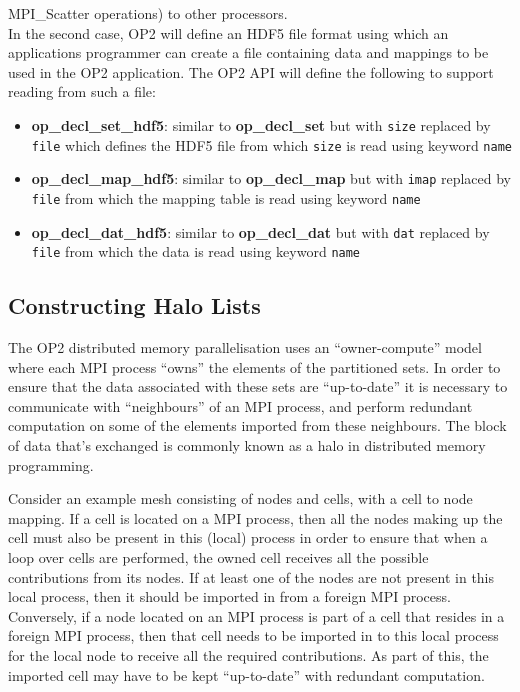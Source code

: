 \documentclass[12pt]{article}
\begin{document}
MPI\_Scatter operations) to other processors.\\
\indent In the second case, OP2 will define an HDF5 file format using which an applications programmer can create a
file containing data and mappings to be used in the OP2 application. The OP2 API will define the following to support
reading from such a file:
\begin{itemize}
\item {\bf op\_decl\_set\_hdf5}: similar to {\bf op\_decl\_set} but with {\tt size} 
replaced by {\tt file} which defines the HDF5 file from which {\tt size} 
is read using keyword {\tt name}

\item {\bf op\_decl\_map\_hdf5}: similar to {\bf op\_decl\_map} but with {\tt imap} 
replaced by {\tt file} from which the mapping table is read using keyword {\tt name}

\item {\bf op\_decl\_dat\_hdf5}: similar to {\bf op\_decl\_dat} but with {\tt dat} 
replaced by {\tt file} from which the data is read using keyword {\tt name}
\end{itemize}


\subsection{Constructing Halo Lists}\label{subsec/halolists}
The OP2 distributed memory parallelisation uses an ``owner-compute'' model where each MPI process ``owns'' the elements
of the partitioned sets. In order to ensure that the data associated with these sets are ``up-to-date'' it is necessary
to communicate with ``neighbours'' of an MPI process, and perform redundant computation on some of the elements
imported from these neighbours. The block of data that's exchanged is commonly known as a halo in distributed memory
programming. 

Consider an example mesh consisting of nodes and cells, with a cell to node mapping. If a cell is located on a MPI
process, then all the nodes making up the cell must also be present in this (local) process in order to ensure that when
a loop over cells are performed, the owned cell receives all the possible contributions from its nodes. If at least one
of the nodes are not present in this local process, then it should be imported in from a foreign MPI process.
Conversely, if a node located on an MPI process is part of a cell that resides in a foreign MPI process, then
that cell needs to be imported in to this local process for the local node to receive all the required
contributions. As part of this, the imported cell may have to be kept ``up-to-date'' with redundant computation.
\end{document}
